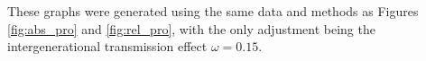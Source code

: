 
\begin{flushleft}
These graphs were generated using the same data and methods as Figures \ref{fig:abs_pro} and \ref{fig:rel_pro}, with the only adjustment being the intergenerational transmission effect \(\omega = 0.15\).
\end{flushleft}




